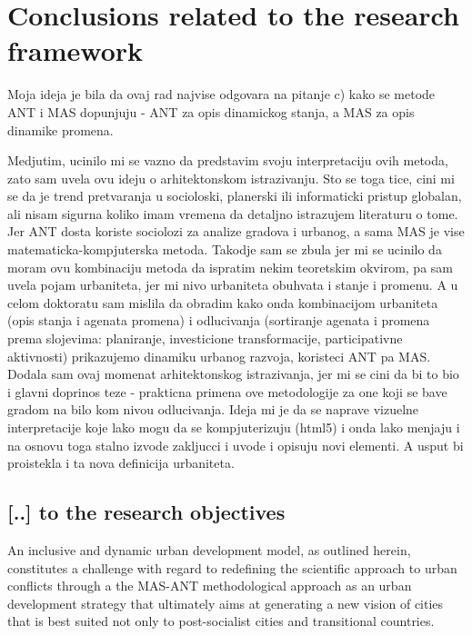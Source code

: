 \documentclass[11pt]{report}
\begin{document}

\section{Conclusions related to the research framework}

Moja ideja je bila da ovaj rad najvise odgovara na pitanje c) kako se metode ANT i MAS dopunjuju - ANT za opis dinamickog stanja, a MAS za opis dinamike promena.

Medjutim, ucinilo mi se vazno da predstavim svoju interpretaciju ovih metoda, zato sam uvela ovu ideju o arhitektonskom istrazivanju. Sto se toga tice, cini mi se da je trend pretvaranja u socioloski, planerski ili informaticki pristup globalan, ali nisam sigurna koliko imam vremena da detaljno istrazujem literaturu o tome. Jer ANT dosta koriste sociolozi za analize gradova i urbanog, a sama MAS je vise matematicka-kompjuterska metoda. Takodje sam se zbula jer mi se ucinilo da moram ovu kombinaciju metoda da ispratim nekim teoretskim okvirom, pa sam uvela pojam urbaniteta, jer mi nivo urbaniteta obuhvata i stanje i promenu. A u celom doktoratu sam mislila da obradim kako onda kombinacijom urbaniteta (opis stanja i agenata promena) i odlucivanja (sortiranje agenata i promena prema slojevima: planiranje, investicione transformacije, participativne aktivnosti) prikazujemo dinamiku urbanog razvoja, koristeci  ANT pa MAS. Dodala sam ovaj momenat arhitektonskog istrazivanja, jer mi se cini da bi to bio i glavni doprinos teze - prakticna primena ove metodologije za one koji se bave gradom na bilo kom nivou odlucivanja. Ideja mi je da se naprave vizuelne interpretacije koje lako mogu da se kompjuterizuju (html5) i onda lako menjaju i na osnovu toga stalno izvode zakljucci i uvode i opisuju novi elementi.
A usput bi proistekla i ta nova definicija urbaniteta.

\subsection{[..] to the research objectives}

An inclusive and dynamic urban development model, as outlined herein, constitutes a challenge with regard to redefining the scientific approach to urban conflicts through a the MAS-ANT methodological approach as an urban development strategy that ultimately aims at generating a new vision of cities that is best suited not only to post-socialist cities and transitional countries.
\end{document}

